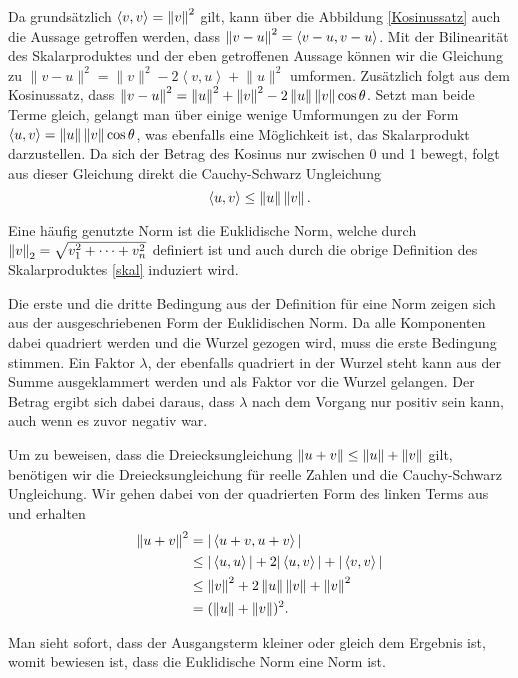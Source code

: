 Da grundsätzlich $\langle v,v\rangle  = \left\lVert v\right\rVert^2$ gilt, kann über die Abbildung \ref{Kosinussatz} auch die Aussage getroffen werden, dass $\left\lVert v-u\right\rVert^2 = \left\langle v-u,v-u\right\rangle $. Mit der Bilinearität des Skalarproduktes und der eben getroffenen Aussage können wir die Gleichung zu 
$\lVert v-u\rVert ^2 = \lVert v\rVert ^2 - 2\left\langle v,u\right\rangle  + \lVert u\rVert ^2$
umformen.
Zusätzlich folgt aus dem Kosinussatz, dass $\left\lVert v-u\right\rVert^2 = \left\lVert u\right\rVert^2 + \left\lVert v\right\rVert^2 - 2 \left\lVert u\right\rVert \left\lVert v\right\rVert \cos\theta$. Setzt man beide Terme gleich, gelangt man über einige wenige Umformungen zu der Form $\left\langle u,v\right\rangle  = \left\lVert u\right\rVert \left\lVert v\right\rVert \cos\theta$, was ebenfalls eine Möglichkeit ist, das Skalarprodukt darzustellen.
Da sich der Betrag des Kosinus nur zwischen 0 und 1 bewegt, folgt aus dieser Gleichung direkt die Cauchy-Schwarz Ungleichung
\begin{equation}
\left\langle u,v\right\rangle  \leq \norm{u} \norm{v}.
\label{cauchy}
\end{equation}

Eine häufig genutzte Norm ist die Euklidische Norm, welche durch $\left\lVert v\right\rVert_2 = \sqrt{v_1^2 + \dots + v_n^2}$ definiert ist und auch durch die obrige Definition des Skalarproduktes \eqref{skal} induziert wird.

Die erste und die dritte Bedingung aus der Definition für eine Norm zeigen sich aus der ausgeschriebenen Form der Euklidischen Norm. Da alle Komponenten dabei quadriert werden und die Wurzel gezogen wird, muss die erste Bedingung stimmen. Ein Faktor $\lambda$, der ebenfalls quadriert in der Wurzel steht kann aus der Summe ausgeklammert werden und als Faktor vor die Wurzel gelangen. Der Betrag ergibt sich dabei daraus, dass $\lambda$ nach dem Vorgang nur positiv sein kann, auch wenn es zuvor negativ war.

Um zu beweisen, dass die Dreiecksungleichung $\left\lVert u+v\right\rVert \leq\left\lVert u\right\rVert + \left\lVert v\right\rVert$  gilt, benötigen wir die Dreiecksungleichung für reelle Zahlen und die Cauchy-Schwarz Ungleichung. Wir gehen dabei von der quadrierten Form des linken Terms aus und erhalten
\begin{align*}
\left\lVert u+v\right\rVert^2 &= |\left\langle u+v,u+v\right\rangle|\\
&\leq |\left\langle u,u\right\rangle| + 2|\left\langle u,v\right\rangle| + |\left\langle v,v\right\rangle|\\
&\leq \left\lVert v\right\rVert^2 + 2\left\lVert u\right\rVert \left\lVert v\right\rVert + \left\lVert v\right\rVert^2\\
&= (\left\lVert u\right\rVert + \left\lVert v\right\rVert)^2.
\end{align*}

Man sieht sofort, dass der Ausgangsterm kleiner oder gleich dem Ergebnis ist, womit bewiesen ist, dass die Euklidische Norm eine Norm ist.

%
